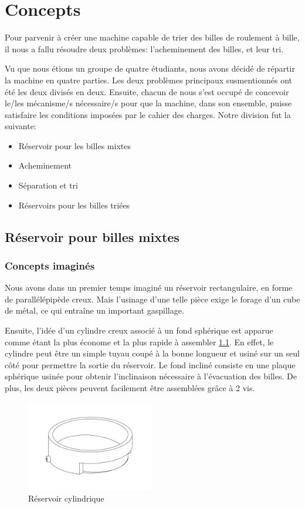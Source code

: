 \chapter{Concepts}
Pour parvenir à créer une machine capable de trier des billes de roulement à bille, il nous a fallu résoudre deux problèmes: l'acheminement des billes, et leur tri.

Vu que nous étions un groupe de quatre étudiants, nous avons décidé de répartir la machine en quatre parties. Les deux problèmes principaux susmentionnés ont été les deux divisés en deux. Ensuite, chacun de nous s'est occupé de concevoir le/les mécanisme/s nécessaire/s pour que la machine, dans son ensemble, puisse satisfaire les conditions imposées par le cahier des charges. Notre division fut la suivante:

\begin{itemize}
    \item Réservoir pour les billes mixtes
    \item Acheminement
    \item Séparation et tri
    \item Réservoirs pour les billes triées
\end{itemize}

\section{Réservoir pour billes mixtes}

\subsection{Concepts imaginés}
Nous avons dans un premier temps imaginé un réservoir rectangulaire, en forme de parallélépipède creux. Mais l’usinage d’une telle pièce exige le forage d’un cube de métal, ce qui entraîne un important gaspillage.

Ensuite, l’idée d’un cylindre creux associé à un fond sphérique est apparue comme étant la plus économe et la plus rapide à assembler \ref{fig:res_cyl}. En effet, le cylindre peut être un simple tuyau coupé à la bonne longueur et usiné sur un seul côté pour permettre la sortie du réservoir. Le fond incliné consiste en une plaque sphérique usinée pour obtenir l'inclinaison nécessaire à l'évacuation des billes. De plus, les deux pièces peuvent facilement être assemblées grâce à 2 vis.

\begin{figure}[htb]
    \centering
    \includegraphics[width=0.5\textwidth]{Graphics/Reservoir_initial/RESERVOIR_CYLINDRIQUE.pdf}
    \caption{Réservoir cylindrique}
    \label{fig:res_cyl}
\end{figure}

